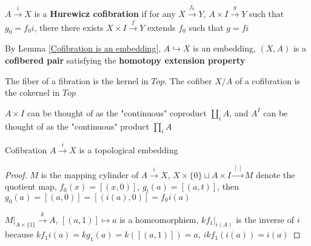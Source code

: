 \documentclass[main]{subfiles}
\begin{document}
\begin{definition}
$A\xrightarrow{i}X$ is a \textbf{Hurewicz cofibration} if for any $X\xrightarrow{f_0}Y$, $A\times I\xrightarrow{g}Y$ such that $g_0=f_0i$, there there exists $X\times I\xrightarrow{f}Y$ extends $f_0$ such that $g=fi$
\begin{center}
\end{center}
By Lemma \ref{Cofibration is an embedding}, $A\hookrightarrow X$ is an embedding, $(X,A)$ is a \textbf{cofibered pair} satisfying the \textbf{homotopy extension property}
\end{definition}

\begin{remark}
The fiber of a fibration is the kernel in $Top$. The cofiber $X/A$ of a cofibration is the cokernel in $Top$ \par
$A\times I$ can be thought of as the "continuous" coproduct $\displaystyle\coprod_iA$, and $A^I$ can be thought of as the "continuous" product $\displaystyle\prod_iA$
\end{remark}

\begin{lemma}\label{Cofibration is an embedding}
Cofibration $A\xrightarrow{i}X$ is a topological embedding
\end{lemma}

\begin{proof}
$M$ is the mapping cylinder of $A\xrightarrow{i}X$, $X\times\{0\}\sqcup A\times I\xrightarrow{[\,]}M$ denote the quotient map, $f_0(x)=[(x,0)]$, $g_t(a)=[(a,t)]$, then $g_0(a)=[(a,0)]=[(i(a),0)]=f_0i(a)$
\begin{center}
\end{center}
$M|_{A\times\{1\}}\xrightarrow{k}A$, $[(a,1)]\mapsto a$ is a homeomorphism, $kf_1|_{i(A)}$ is the inverse of $i$ because $kf_1i(a)=kg_1(a)=k([(a,1)])=a$, $ikf_1(i(a))=i(a)$
\end{proof}
\end{document}
